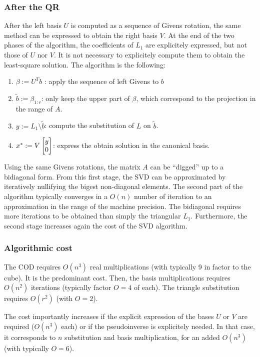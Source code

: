 \documentclass{book}
\begin{document}
\subsubsection{After the QR}
After the left basis $U$ is computed as a sequence of Givens rotation, the same method can be expressed to obtain the right basis $V$. At the end of the two phases of the algorithm, the coefficients of $L_1$ are explicitely expressed, but not those of $U$ nor $V$. It is not necessary to explicitely compute them to obtain the least-square solution. The algorithm is the following:
\begin{enumerate}
\item $\beta := U^T b$ :  apply the sequence of left Givens to $b$
\item $\tilde{b} := \beta_{1:r}$: only keep the upper part of $\beta$, which correspond to the projection in the range of $A$.
\item $y := L_1 \setminus \tilde{b}$: compute the substitution of $L$ on $\tilde{b}$.
\item $x^* := V \begin{bmatrix} y \\ 0 \end{bmatrix}$: express the obtain solution in the canonical basis.
\end{enumerate}

Using the same Givens rotations, the matrix $A$ can be ``digged'' up to a bidiagonal form. From this first stage, the SVD can be approximated by iteratively nullifying the bigest non-diagonal elements. The second part of the algorithm typically converges in a $O(n)$ number of iteration to an approximation in the range of the machine precision. The bidiagonal requires more iterations to be obtained than simply the triangular $L_1$. Furthermore, the second stage increases again the cost of the SVD algorithm.

\subsubsection{Algorithmic cost}

The COD requires $O(n^3)$ real multiplications (with typically 9 in factor to the cube). It is the predominant cost. Then, the basis multiplications requires $O(n^2)$ iterations (typically factor $O=4$ of each). The triangle substitution requires $O(r^2)$ (with $O=2$). 

The cost importantly increases if the explicit expression of the bases $U$ or $V$ are required ($O(n^3)$ each) or if the pseudoinverse is explicitely needed. In that case, it corresponds to $n$ substitution and basis multiplication, for an added $O(n^3)$ (with typically $O=6$).
\end{document}
